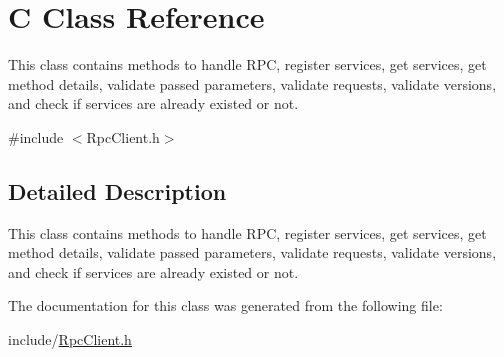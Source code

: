 \hypertarget{classC}{}\section{C Class Reference}
\label{classC}


This class contains methods to handle R\+PC, register services, get services, get method details, validate passed parameters, validate requests, validate versions, and check if services are already existed or not.  




{\ttfamily \#include $<$Rpc\+Client.\+h$>$}



\subsection{Detailed Description}
This class contains methods to handle R\+PC, register services, get services, get method details, validate passed parameters, validate requests, validate versions, and check if services are already existed or not. 

The documentation for this class was generated from the following file\+:\begin{DoxyCompactItemize}
\item 
include/\hyperlink{RpcClient_8h}{Rpc\+Client.\+h}\end{DoxyCompactItemize}
